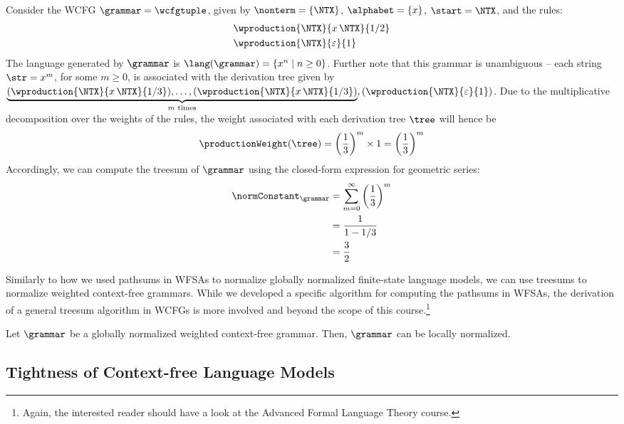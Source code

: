 \begin{example}
\label{ex:geometric_treesum}
    Consider the WCFG $\grammar=\wcfgtuple$, given by $\nonterm=\{\NTX\}$, $\alphabet=\{x\}$, $\start=\NTX$, and the rules:
    \begin{align*}
        & \wproduction{\NTX}{x\, \NTX}{1/2} \\
        & \wproduction{\NTX}{\varepsilon}{1}
    \end{align*}
    The language generated by $\grammar$ is $\lang(\grammar)=\{x^n\mid n\geq 0\}$. Further note that this grammar is unambiguous -- each string $\str=x^m$, for some $m\geq 0$, is associated with the derivation tree given by $\underbrace{(\wproduction{\NTX}{x\, \NTX}{1/3}),\dots,(\wproduction{\NTX}{x\, \NTX}{1/3})}_{m\text{ times}},(\wproduction{\NTX}{\varepsilon}{1})$. Due to the multiplicative decomposition over the weights of the rules, the weight associated with each derivation tree $\tree$ will hence be
    \begin{equation*}
        \productionWeight(\tree)=\left(\frac{1}{3}\right)^m\times 1 = \left(\frac{1}{3}\right)^m
    \end{equation*}
    Accordingly, we can compute the treesum of $\grammar$ using the closed-form expression for geometric series:
    \begin{align*}
        \normConstant_\grammar&=\sum_{m=0}^\infty\left(\frac{1}{3}\right)^m \\
        & = \frac{1}{1-1/3} \\
        & = \frac{3}{2}
    \end{align*}
\end{example}

Similarly to how we used pathsums in WFSAs to normalize globally normalized finite-state language models, we can use treesums to normalize weighted context-free grammars.
While we developed a specific algorithm for computing the pathsums in WFSAs, the derivation of a general treesum algorithm in WCFGs is more involved and beyond the scope of this course.\footnote{Again, the interested reader should have a look at the Advanced Formal Language Theory course.}


\begin{theorem}\label{thm:globally-locally-normalized-wcfgs}
    Let $\grammar$ be a globally normalized weighted context-free grammar. 
    Then, $\grammar$ can be locally normalized.
\end{theorem}


\subsection{Tightness of Context-free Language Models}

